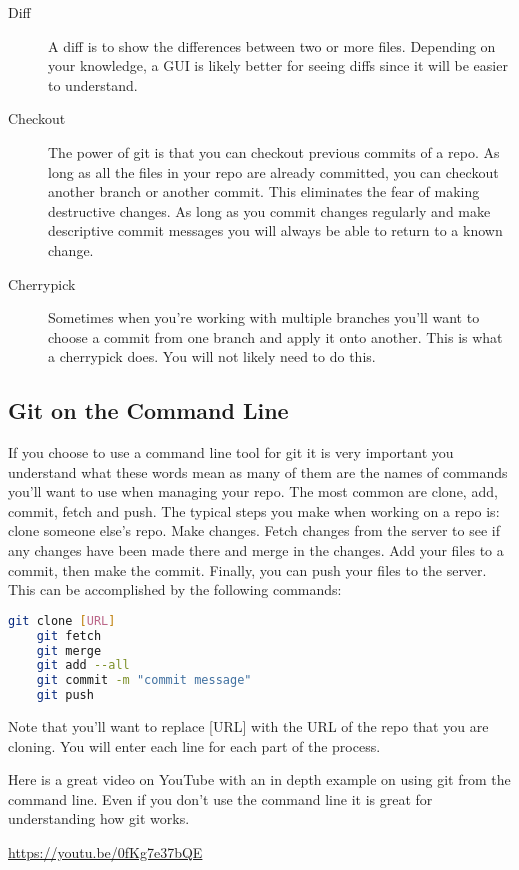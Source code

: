 \begin{description}
	\item[Diff] A diff is to show the differences between two or more files. Depending on your knowledge, a GUI is likely better for seeing diffs since it will be easier to understand.
	\item[Checkout] The power of git is that you can checkout previous commits of a repo. As long as all the files in your repo are already committed, you can checkout another branch or another commit. This eliminates the fear of making destructive changes. As long as you commit changes regularly and make descriptive commit messages you will always be able to return to a known change.
	\item[Cherrypick] Sometimes when you're working with multiple branches you'll want to choose a commit from one branch and apply it onto another. This is what a cherrypick does. You will not likely need to do this.
\end{description}

\subsection{Git on the Command Line}

If you choose to use a command line tool for git it is very important you understand what these words mean as many of them are the names of commands you'll want to use when managing your repo. The most common are clone, add, commit, fetch and push. The typical steps you make when working on a repo is: clone someone else's repo. Make changes. Fetch changes from the server to see if any changes have been made there and merge in the changes. Add your files to a commit, then make the commit. Finally, you can push your files to the server. This can be accomplished by the following commands:

\begin{lstlisting}[language=bash]
	git clone [URL]
	git fetch
	git merge
	git add --all
	git commit -m "commit message"
	git push
\end{lstlisting}

Note that you'll want to replace [URL] with the URL of the repo that you are cloning. You will enter each line for each part of the process.

Here is a great video on YouTube with an in depth example on using git from the command line. Even if you don't use the command line it is great for understanding how git works.
\begin{center}
	\url{https://youtu.be/0fKg7e37bQE}
\end{center}

